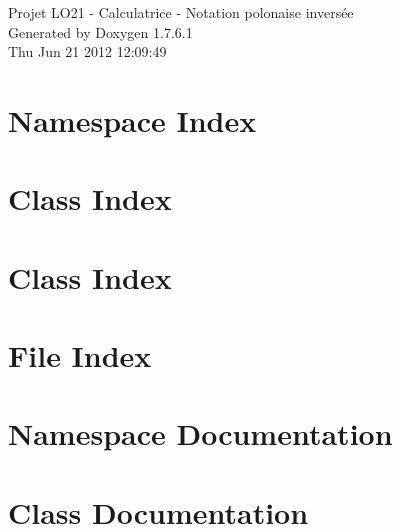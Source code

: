 \documentclass[a4paper]{book}
\begin{document}
\hypersetup{pageanchor=false,citecolor=blue}
\begin{titlepage}
\vspace*{7cm}
\begin{center}
{\Large \-Projet \-L\-O21 -\/ \-Calculatrice -\/ \-Notation polonaise inversée }\\
\vspace*{1cm}
{\large \-Generated by Doxygen 1.7.6.1}\\
\vspace*{0.5cm}
{\small Thu Jun 21 2012 12:09:49}\\
\end{center}
\end{titlepage}
\clearemptydoublepage
{}
\tableofcontents
\clearemptydoublepage
{}
\hypersetup{pageanchor=true,citecolor=blue}
\chapter{\-Namespace \-Index}

\chapter{\-Class \-Index}

\chapter{\-Class \-Index}

\chapter{\-File \-Index}

\chapter{\-Namespace \-Documentation}


\chapter{\-Class \-Documentation}
























\end{document}
